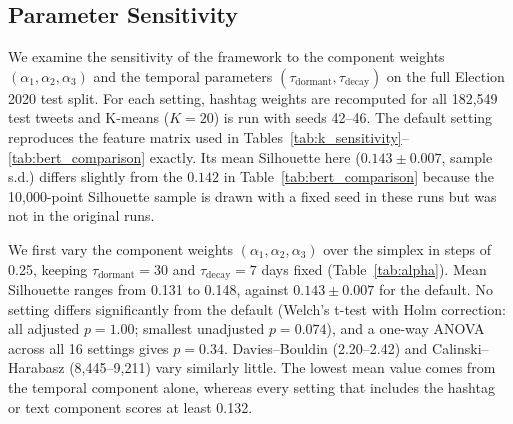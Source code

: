 \documentclass[pdflatex,sn-mathphys-num]{sn-jnl}%
\begin{document}
\subsection{Parameter Sensitivity}\label{subsec_sens}

We examine the sensitivity of the framework to the component weights $(\alpha_1, \alpha_2, \alpha_3)$ and the temporal parameters $(\tau_{\text{dormant}}, \tau_{\text{decay}})$ on the full Election 2020 test split. For each setting, hashtag weights are recomputed for all 182,549 test tweets and K-means ($K=20$) is run with seeds 42--46. The default setting reproduces the feature matrix used in Tables~\ref{tab:k_sensitivity}--\ref{tab:bert_comparison} exactly. Its mean Silhouette here ($0.143 \pm 0.007$, sample s.d.) differs slightly from the $0.142$ in Table~\ref{tab:bert_comparison} because the 10,000-point Silhouette sample is drawn with a fixed seed in these runs but was not in the original runs.

We first vary the component weights $(\alpha_1, \alpha_2, \alpha_3)$ over the simplex in steps of 0.25, keeping $\tau_{\text{dormant}} = 30$ and $\tau_{\text{decay}} = 7$ days fixed (Table~\ref{tab:alpha}). Mean Silhouette ranges from 0.131 to 0.148, against $0.143 \pm 0.007$ for the default. No setting differs significantly from the default (Welch's t-test with Holm correction: all adjusted $p = 1.00$; smallest unadjusted $p = 0.074$), and a one-way ANOVA across all 16 settings gives $p = 0.34$. Davies--Bouldin (2.20--2.42) and Calinski--Harabasz (8,445--9,211) vary similarly little. The lowest mean value comes from the temporal component alone, whereas every setting that includes the hashtag or text component scores at least 0.132.
\end{document}
